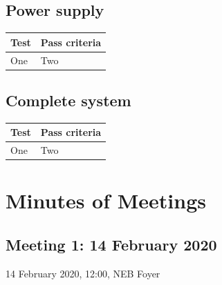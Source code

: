 \documentclass[12pt]{article}
\begin{document}
\subsection{Power supply}
\begin{center}
  \begin{table}[!htb]
    
    \hskip-2.2cm\begin{tabular}{|p{8cm}|p{10cm}|}
        \hline
        \textbf{Test} & \textbf{Pass criteria} \\
        \hline

        One & Two \\

        \hline

      \end{tabular}    
      
      \label{tab:summary_measurments}
     \end{table}
  \end{center}

\subsection{Complete system}
\begin{center}
  \begin{table}[!htb]
    
    \hskip-2.2cm\begin{tabular}{|p{8cm}|p{10cm}|}
        \hline
        \textbf{Test} & \textbf{Pass criteria} \\
        \hline

        One & Two \\

        \hline

      \end{tabular}    
      
      \label{tab:summary_measurments}
     \end{table}
  \end{center}

\newpage
\section{Minutes of Meetings}
\subsection{Meeting 1: 14 February 2020}
14 February 2020, 12:00, NEB Foyer
\end{document}
